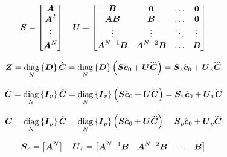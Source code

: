 \documentclass[12pt,a4paper]{article}
\begin{document}
\begin{equation*}
    \mbox{\boldmath $S$} =
        \begin{bmatrix}
        \mbox{\boldmath $A$} \\
        \mbox{\boldmath $A$}^2 \\
        \vdots \\
        \mbox{\boldmath $A$}^{N}\\
        \end{bmatrix}
    \quad
    \mbox{\boldmath $U$} =
        \begin{bmatrix}
        \mbox{\boldmath $B$}               & \mbox{\boldmath $0$}             & \dots & \mbox{\boldmath $0$} \\
        \mbox{\boldmath $A$}\mbox{\boldmath $B$}          & \mbox{\boldmath $B$}             & \dots & \mbox{\boldmath $0$} \\
        \vdots              & \vdots            & \ddots& \vdots \\
        \mbox{\boldmath $A$}^{N-1}\mbox{\boldmath $B$}    & \mbox{\boldmath $A$}^{N-2}\mbox{\boldmath $B$}  & \dots & \mbox{\boldmath $B$} \\
        \end{bmatrix}
\end{equation*}

\begin{equation*}
    \ZMP = 
        \diag{N}{\M{D}} \cState = 
        \diag{N}{\M{D}} \left(\M{S} \cstate_0  +  \M{U} \cJerk \right) = 
        \M{S}_z \cstate_0 + \M{U}_z \cJerk
\end{equation*}

\begin{equation*}
    \cVel = 
        \diag{N}{\M{I}_{v}} \cState = 
        \diag{N}{\M{I}_{v}} \left(\M{S} \cstate_0  +  \M{U} \cJerk \right) = 
        \M{S}_v \cstate_0 + \M{U}_v \cJerk
\end{equation*}

\begin{equation*}
    \cPos = 
        \diag{N}{\M{I}_{p}} \cState = 
        \diag{N}{\M{I}_{p}} \left(\M{S} \cstate_0  +  \M{U} \cJerk \right) = 
        \M{S}_{p} \cstate_0 + \M{U}_{p} \cJerk
\end{equation*}

\begin{equation*}
    \mbox{\boldmath $S$}_e =
        \begin{bmatrix}
        \mbox{\boldmath $A$}^{N}\\
        \end{bmatrix}
    \quad
    \mbox{\boldmath $U$}_e =
        \begin{bmatrix}
        \mbox{\boldmath $A$}^{N-1}\mbox{\boldmath $B$}    & \mbox{\boldmath $A$}^{N-2}\mbox{\boldmath $B$}  & \dots & \mbox{\boldmath $B$} \\
        \end{bmatrix}
\end{equation*}
\end{document}
